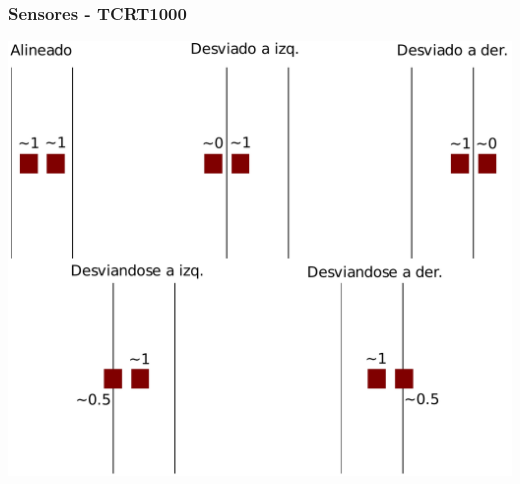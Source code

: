 \documentclass[compress]{beamer}
\begin{document}
\begin{frame}
\frametitle{Sensores - TCRT1000}
\begin{center}
 \includegraphics[height=0.8\textheight]{./img/sensores_image.pdf}
\end{center}
\end{frame}
\end{document}
